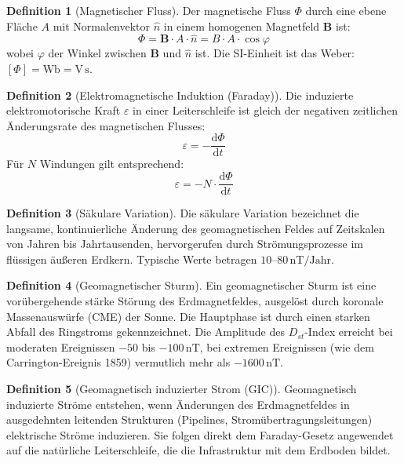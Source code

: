 ﻿\documentclass[a4paper,12pt]{article}
\theoremstyle{definition}
\newtheorem{definition}{Definition}
\begin{document}
\begin{definition}[Magnetischer Fluss]
    Der magnetische Fluss $\Phi$ durch eine ebene Fl\"ache $A$ mit
    Normalenvektor $\hat{n}$ in einem homogenen Magnetfeld $\mathbf{B}$ ist:
    \[
        \Phi = \mathbf{B} \cdot A \cdot \hat{n} = B \cdot A \cdot \cos\varphi
    \]
    wobei $\varphi$ der Winkel zwischen $\mathbf{B}$ und $\hat{n}$ ist.
    Die SI-Einheit ist das Weber: $[\Phi] = \mathrm{Wb} = \mathrm{V\,s}$.
\end{definition}

\begin{definition}[Elektromagnetische Induktion (Faraday)]
    Die induzierte elektromotorische Kraft $\varepsilon$ in einer Leiterschleife
    ist gleich der negativen zeitlichen \"Anderungsrate des magnetischen Flusses:
    \[
        \varepsilon = -\frac{\mathrm{d}\Phi}{\mathrm{d}t}
    \]
    F\"ur $N$ Windungen gilt entsprechend:
    \[
        \varepsilon = -N \cdot \frac{\mathrm{d}\Phi}{\mathrm{d}t}
    \]
\end{definition}

\begin{definition}[S\"akulare Variation]
    Die s\"akulare Variation bezeichnet die langsame, kontinuierliche \"Anderung
    des geomagnetischen Feldes auf Zeitskalen von Jahren bis Jahrtausenden,
    hervorgerufen durch Str\"omungsprozesse im fl\"ussigen \"au{\ss}eren Erdkern.
    Typische Werte betragen $10$--$80\,\mathrm{nT/Jahr}$.
\end{definition}

\begin{definition}[Geomagnetischer Sturm]
    Ein geomagnetischer Sturm ist eine vor\"ubergehende st\"arke St\"orung
    des Erdmagnetfeldes, ausgel\"ost durch koronale Massenausw\"urfe (CME)
    der Sonne. Die Hauptphase ist durch einen starken Abfall des Ringstroms
    gekennzeichnet. Die Amplitude des $D_{st}$-Index erreicht
    bei moderaten Ereignissen $-50$ bis $-100\,\mathrm{nT}$,
    bei extremen Ereignissen (wie dem Carrington-Ereignis 1859) vermutlich
    mehr als $-1600\,\mathrm{nT}$.
\end{definition}

\begin{definition}[Geomagnetisch induzierter Strom (GIC)]
    Geomagnetisch induzierte Str\"ome entstehen, wenn \"Anderungen des
    Erdmagnetfeldes in ausgedehnten leitenden Strukturen (Pipelines,
    Strom\"ubertragungs\-leitungen) elektrische Str\"ome induzieren.
    Sie folgen direkt dem Faraday-Gesetz angewendet auf die nat\"urliche
    Leiterschleife, die die Infrastruktur mit dem Erdboden bildet.
\end{definition}
\end{document}
